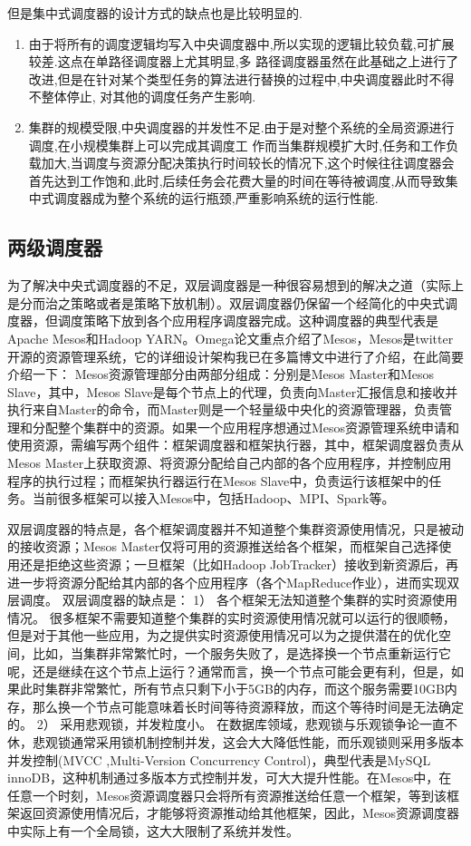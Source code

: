 但是集中式调度器的设计方式的缺点也是比较明显的.
\begin{enumerate}
\item 由于将所有的调度逻辑均写入中央调度器中,所以实现的逻辑比较负载,可扩展较差.这点在单路径调度器上尤其明显,多
路径调度器虽然在此基础之上进行了改进,但是在针对某个类型任务的算法进行替换的过程中,中央调度器此时不得不整体停止,
对其他的调度任务产生影响.
\item 集群的规模受限,中央调度器的并发性不足.由于是对整个系统的全局资源进行调度,在小规模集群上可以完成其调度工
作而当集群规模扩大时,任务和工作负载加大,当调度与资源分配决策执行时间较长的情况下,这个时候往往调度器会首先达到工作饱和,此时,后续任务会花费大量的时间在等待被调度,从而导致集中式调度器成为整个系统的运行瓶颈,严重影响系统的运行性能.
\end{enumerate}

\subsection{两级调度器}
为了解决中央式调度器的不足，双层调度器是一种很容易想到的解决之道（实际上是分而治之策略或者是策略下放机制）。双层调度器仍保留一个经简化的中央式调度器，但调度策略下放到各个应用程序调度器完成。这种调度器的典型代表是Apache Mesos和Hadoop YARN。Omega论文重点介绍了Mesos，Mesos是twitter开源的资源管理系统，它的详细设计架构我已在多篇博文中进行了介绍，在此简要介绍一下：
Mesos资源管理部分由两部分组成：分别是Mesos Master和Mesos Slave，其中，Mesos Slave是每个节点上的代理，负责向Master汇报信息和接收并执行来自Master的命令，而Master则是一个轻量级中央化的资源管理器，负责管理和分配整个集群中的资源。如果一个应用程序想通过Mesos资源管理系统申请和使用资源，需编写两个组件：框架调度器和框架执行器，其中，框架调度器负责从Mesos Master上获取资源、将资源分配给自己内部的各个应用程序，并控制应用程序的执行过程；而框架执行器运行在Mesos Slave中，负责运行该框架中的任务。当前很多框架可以接入Mesos中，包括Hadoop、MPI、Spark等。

双层调度器的特点是，各个框架调度器并不知道整个集群资源使用情况，只是被动的接收资源；Mesos Master仅将可用的资源推送给各个框架，而框架自己选择使用还是拒绝这些资源；一旦框架（比如Hadoop JobTracker）接收到新资源后，再进一步将资源分配给其内部的各个应用程序（各个MapReduce作业），进而实现双层调度。
双层调度器的缺点是：
1）  各个框架无法知道整个集群的实时资源使用情况。
很多框架不需要知道整个集群的实时资源使用情况就可以运行的很顺畅，但是对于其他一些应用，为之提供实时资源使用情况可以为之提供潜在的优化空间，比如，当集群非常繁忙时，一个服务失败了，是选择换一个节点重新运行它呢，还是继续在这个节点上运行？通常而言，换一个节点可能会更有利，但是，如果此时集群非常繁忙，所有节点只剩下小于5GB的内存，而这个服务需要10GB内存，那么换一个节点可能意味着长时间等待资源释放，而这个等待时间是无法确定的。
2）  采用悲观锁，并发粒度小。
在数据库领域，悲观锁与乐观锁争论一直不休，悲观锁通常采用锁机制控制并发，这会大大降低性能，而乐观锁则采用多版本并发控制(MVCC ,Multi-Version Concurrency Control)，典型代表是MySQL innoDB，这种机制通过多版本方式控制并发，可大大提升性能。在Mesos中，在任意一个时刻，Mesos资源调度器只会将所有资源推送给任意一个框架，等到该框架返回资源使用情况后，才能够将资源推动给其他框架，因此，Mesos资源调度器中实际上有一个全局锁，这大大限制了系统并发性。
